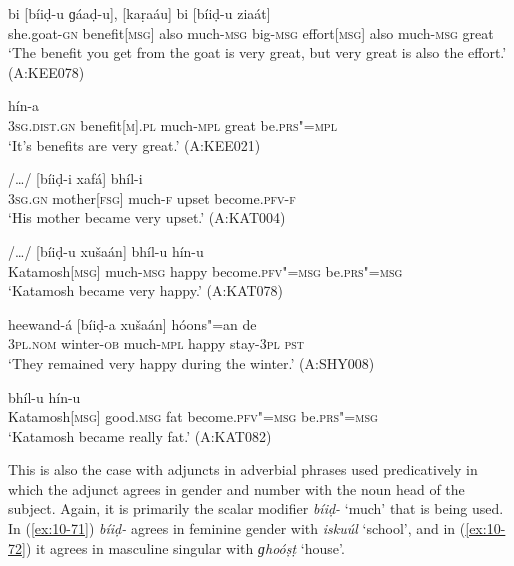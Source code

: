 \begin{exe}
\ex
\label{ex:10-65}
\gll [čhéel"=ii phaaidá] bi [bíiḍ-u ɡáaḍ-u], [kaṛaáu] bi [bíiḍ-u ziaát] \\
she.goat-\textsc{gn} benefit[\textsc{msg}] also much-\textsc{msg} big-\textsc{msg}  effort[\textsc{msg}] also much-\textsc{msg} great \\
\glt `The benefit you get from the goat is very great, but very great is also the effort.' (A:KEE078)

\ex
\label{ex:10-66}
 hín-a \\
\textsc{3sg}.\textsc{dist.gn} benefit[\textsc{m}].\textsc{pl} much-\textsc{mpl} great  be.\textsc{prs"=mpl} \\
\glt `It's benefits are very great.' (A:KEE021)

\ex
\label{ex:10-67}
 /{\ldots}/ [bíiḍ-i xafá] bhíl-i \\
\textsc{3sg.gn} mother[\textsc{fsg}] {} much-\textsc{f} upset become.\textsc{pfv-f} \\
\glt `His mother became very upset.' (A:KAT004)

\ex
\label{ex:10-68}
\gll [kaṭamúš] /{\ldots}/ [bíiḍ-u xušaán] bhíl-u hín-u \\
Katamosh[\textsc{msg}] {} much-\textsc{msg} happy become.\textsc{pfv"=msg} be.\textsc{prs"=msg}\\
\glt `Katamosh became very happy.' (A:KAT078)

\ex
\label{ex:10-69}
\gll [se] heewand-á [bíiḍ-a xušaán] hóons"=an de \\
\textsc{3pl.nom} winter-\textsc{ob} much-\textsc{mpl} happy stay-\textsc{3pl} \textsc{pst} \\
\glt `They remained very happy during the winter.' (A:SHY008)

\ex
\label{ex:10-70}
 bhíl-u hín-u \\
Katamosh[\textsc{msg}] good.\textsc{msg} fat become.\textsc{pfv"=msg}  be.\textsc{prs"=msg} \\
\glt `Katamosh became really fat.' (A:KAT082)
\end{exe}

This is also the case with adjuncts in adverbial phrases used predicatively in which the adjunct agrees in gender and number with the noun head of the subject. Again, it is primarily the scalar modifier \textit{bíiḍ-} `much' that is being used. In (\ref{ex:10-71}) \textit{bíiḍ-} agrees in feminine gender with \textit{iskuúl} `school', and in (\ref{ex:10-72}) it agrees in masculine singular with \textit{ɡhoóṣṭ} `house'. 

